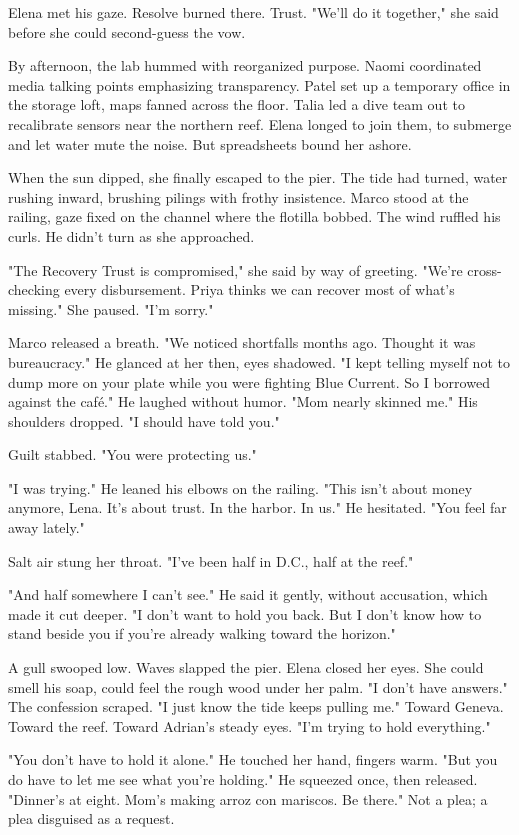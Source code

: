 Elena met his gaze. Resolve burned there. Trust. "We'll do it together," she said before she could second-guess the vow.

By afternoon, the lab hummed with reorganized purpose. Naomi coordinated media talking points emphasizing transparency. Patel set up a temporary office in the storage loft, maps fanned across the floor. Talia led a dive team out to recalibrate sensors near the northern reef. Elena longed to join them, to submerge and let water mute the noise. But spreadsheets bound her ashore.

When the sun dipped, she finally escaped to the pier. The tide had turned, water rushing inward, brushing pilings with frothy insistence. Marco stood at the railing, gaze fixed on the channel where the flotilla bobbed. The wind ruffled his curls. He didn't turn as she approached.

"The Recovery Trust is compromised," she said by way of greeting. "We're cross-checking every disbursement. Priya thinks we can recover most of what's missing." She paused. "I'm sorry."

Marco released a breath. "We noticed shortfalls months ago. Thought it was bureaucracy." He glanced at her then, eyes shadowed. "I kept telling myself not to dump more on your plate while you were fighting Blue Current. So I borrowed against the café." He laughed without humor. "Mom nearly skinned me." His shoulders dropped. "I should have told you."

Guilt stabbed. "You were protecting us."

"I was trying." He leaned his elbows on the railing. "This isn't about money anymore, Lena. It's about trust. In the harbor. In us." He hesitated. "You feel far away lately."

Salt air stung her throat. "I've been half in D.C., half at the reef."

"And half somewhere I can't see." He said it gently, without accusation, which made it cut deeper. "I don't want to hold you back. But I don't know how to stand beside you if you're already walking toward the horizon."

A gull swooped low. Waves slapped the pier. Elena closed her eyes. She could smell his soap, could feel the rough wood under her palm. "I don't have answers." The confession scraped. "I just know the tide keeps pulling me." Toward Geneva. Toward the reef. Toward Adrian's steady eyes. "I'm trying to hold everything."

"You don't have to hold it alone." He touched her hand, fingers warm. "But you do have to let me see what you're holding." He squeezed once, then released. "Dinner's at eight. Mom's making arroz con mariscos. Be there." Not a plea; a plea disguised as a request.


